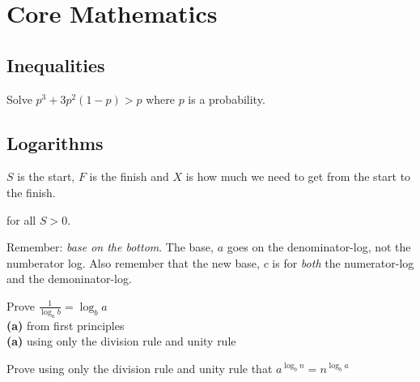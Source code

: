 
\chapter{Core Mathematics}



\section{Inequalities}

\begin{example}
Solve $p^3 + 3p^2(1-p) > p$ where $p$ is a probability.
\end{example}


\section{Logarithms}



$S$ is the start, $F$ is the finish and $X$ is how much we need to get from the start to the finish.




for all $S > 0$.



Remember: \textit{base on the bottom}. The base, $a$ goes on the denominator-log, 
not the numberator log. Also remember that the new base, $c$ is for \textit{both} 
the numerator-log and the demoninator-log. 


\begin{example}
Prove $\frac{1}{\log_a b} = \log_b{a}$ \\
\textbf{(a)} from first principles \\
\textbf{(a)} using only the division rule and unity rule
\end{example}


\begin{example}
Prove using only the division rule and unity rule that $a^{\log_b n} = n^{\log_b a}$
\end{example}



